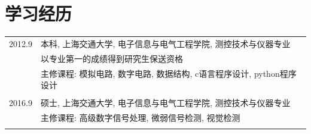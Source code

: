 \documentclass[a4paper,11pt]{article}
\begin{document}
\section{学习经历}
\begin{tabular}{rl}
\textsc{2012.9} & 本科, 上海交通大学, 电子信息与电气工程学院, 测控技术与仪器专业\\
& 以专业第一的成绩得到研究生保送资格\\
& 主修课程: 模拟电路, 数字电路, 数据结构, c语言程序设计, python程序设计\\&\\
\textsc{2016.9} & 硕士, 上海交通大学, 电子信息与电气工程学院, 测控技术与仪器专业\\
& 主修课程: 高级数字信号处理, 微弱信号检测, 视觉检测\\&\\
\end{tabular}


\end{document}
